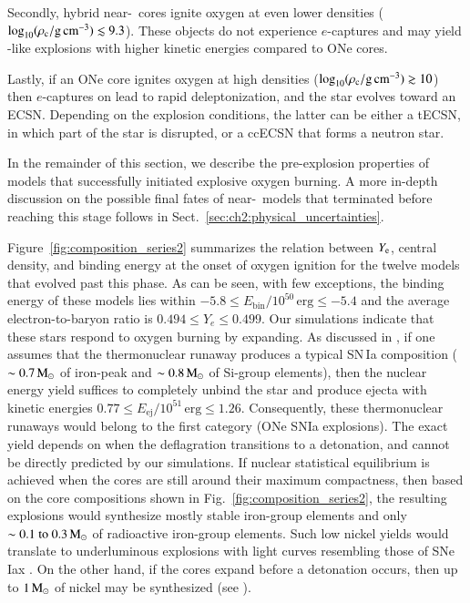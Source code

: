 \documentclass[main.tex]{subfiles}
\begin{document}
Secondly, hybrid near-\mch\  cores ignite oxygen at even lower densities ($\log_{10} (\rho_{\mathrm{c}}/ \mathrm{g\,cm^{-3}}) \lesssim 9.3$). These objects do not experience $e$-captures and may yield \ia-like explosions with higher kinetic energies compared to ONe cores. 

Lastly, if an ONe core ignites oxygen at high densities ($\log_{10} (\rho_{\mathrm{c}}/ \mathrm{g\,cm^{-3}}) \gtrsim 10$) then $e$-captures on  lead to rapid deleptonization, and the star  evolves toward an ECSN. Depending on the explosion conditions, the latter can be either a tECSN, in which part of the star is disrupted, or a ccECSN that forms a neutron star. 
    

In the remainder of this section, we describe the pre-explosion properties of models that successfully initiated explosive oxygen burning. A more in-depth discussion on the possible final fates of near-\mch\ models that terminated before reaching this stage follows in Sect.~\ref{sec:ch2:physical_uncertainties}. 

Figure~\ref{fig:composition_series2} summarizes  the relation between $Y_{\rm e}$, central density, and binding energy at the onset of oxygen ignition for the twelve models that evolved past this phase. 
As can be seen, with few exceptions, the binding energy of these models lies within $-5.8 \leq E_{\text{bin}} / 10^{50}\,\text{erg} \leq -5.4$ and the average electron-to-baryon ratio is $0.494 \leq Y_e \leq 0.499$. 
Our simulations indicate that these stars respond to  oxygen burning by expanding. As discussed in , if one assumes that the thermonuclear runaway produces a typical SN\,Ia 
composition  ($\sim 0.7\mathrm{\,M_\odot}$ of iron-peak and $\sim 0.8\mathrm{\,M_\odot}$ of Si-group elements), 
then the nuclear energy yield suffices to completely unbind the star and produce ejecta with kinetic energies  
$0.77 \leq E_{\text{ej}} / 10^{51}\,\text{erg} \leq 1.26$. 
Consequently, these thermonuclear runaways would belong to the first category (ONe SNIa explosions). 
The exact  yield depends on  when the deflagration transitions to a detonation, 
and cannot be directly predicted by our simulations.  
If nuclear statistical equilibrium is achieved when the cores are still around their maximum compactness, 
then based on the core compositions shown in Fig.~\ref{fig:composition_series2}, the resulting explosions would synthesize mostly stable iron-group 
elements and only $\sim \numrange{0.1}{0.3}\msun$ of radioactive iron-group elements. 
Such low nickel yields would translate to underluminous explosions with light curves resembling those of  
SNe\,Iax \citep[e.g.,][]{2017hsnJ}. 
On the other hand, if the cores expand before a detonation occurs, 
then up to $1\mathrm{\,M_\odot}$ of nickel may be synthesized (see ).
\end{document}
